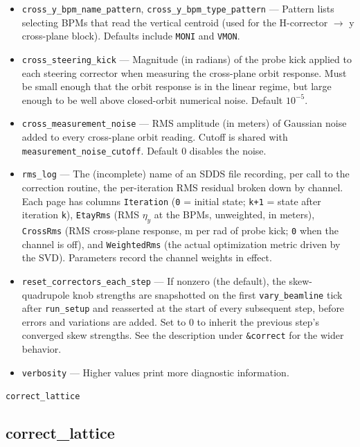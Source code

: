 \documentclass[11pt]{article}
\begin{document}
\begin{itemize}
\item \verb|cross_y_bpm_name_pattern|, \verb|cross_y_bpm_type_pattern| ---
  Pattern lists selecting BPMs that read the vertical centroid (used for
  the H-corrector $\to$ y cross-plane block).  Defaults include \verb|MONI|
  and \verb|VMON|.
\item \verb|cross_steering_kick| --- Magnitude (in radians) of the probe
  kick applied to each steering corrector when measuring the cross-plane
  orbit response.  Must be small enough that the orbit response is in the
  linear regime, but large enough to be well above closed-orbit numerical
  noise.  Default $10^{-5}$.
\item \verb|cross_measurement_noise| --- RMS amplitude (in meters) of
  Gaussian noise added to every cross-plane orbit reading.  Cutoff is
  shared with \verb|measurement_noise_cutoff|.  Default 0 disables the
  noise.
\item \verb|rms_log| --- The (incomplete) name of an SDDS file recording,
  per call to the correction routine, the per-iteration RMS residual
  broken down by channel.  Each page has columns \verb|Iteration|
  (\verb|0| = initial state; \verb|k+1| = state after iteration \verb|k|),
  \verb|EtayRms| (RMS $\eta_y$ at the BPMs, unweighted, in meters),
  \verb|CrossRms| (RMS cross-plane response, m per rad of probe kick;
  \verb|0| when the channel is off), and \verb|WeightedRms| (the actual
  optimization metric driven by the SVD).  Parameters record the channel
  weights in effect.
\item \verb|reset_correctors_each_step| --- If nonzero (the default), the skew-quadrupole
  knob strengths are snapshotted on the first \verb|vary_beamline| tick after
  \verb|run_setup| and reasserted at the start of every subsequent step, before
  errors and variations are added.  Set to 0 to inherit the previous step's converged
  skew strengths.  See the description under \verb|&correct| for the wider behavior.
\item \verb|verbosity| --- Higher values print more diagnostic information.
\end{itemize}


\newpage
\begin{center}{\Large\verb|correct_lattice|}\end{center}
\subsection{correct\_lattice \label{subsec:correctlattice}}
\end{document}

